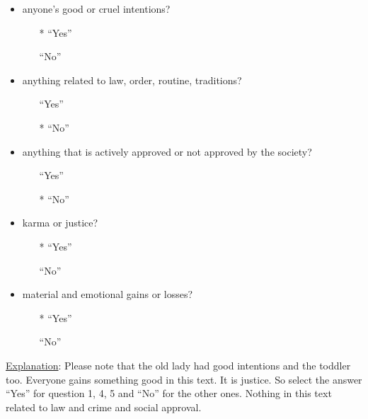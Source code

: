 \documentclass[11pt]{article}
\makeatletter
\newcommand*{\radiobutton}{\@ifstar{\@radiobutton0}{\@radiobutton1}}
\newcommand*{\@radiobutton}[1]{\begin{tikzpicture}
    \pgfmathsetlengthmacro\radius{height("X")/3}
    \draw[radius=\radius] circle;
    \ifcase#1 \fill[radius=.6*\radius] circle;\fi
  \end{tikzpicture}}
\makeatother
\begin{document}
\begin{table*}[t!]
\begin{minipage}[t]{.43\linewidth}
    \begin{itemize}[noitemsep,topsep=0.1pt]
            \item anyone's good or cruel intentions?
            \begin{itemize}[topsep=0.1pt,noitemsep]
                \item[\radiobutton*] ``Yes''
                \item[\radiobutton] ``No''
            \end{itemize}
            \item anything related to law, order, routine, traditions?
            \begin{itemize}[topsep=0.1pt,noitemsep]
                \item[\radiobutton] ``Yes''
                \item[\radiobutton*] ``No''
            \end{itemize}
            \item anything that is actively approved or not approved by the society?
            \begin{itemize}[topsep=0.1pt,noitemsep]
                \item[\radiobutton] ``Yes''
                \item[\radiobutton*] ``No''
            \end{itemize}
            \item karma or justice?
            \begin{itemize}[topsep=0.1pt,noitemsep]
                \item[\radiobutton*] ``Yes''
                \item[\radiobutton] ``No''
            \end{itemize}
            \item material and emotional gains or losses?
            \begin{itemize}[topsep=0.1pt,noitemsep]
                \item[\radiobutton*] ``Yes''
                \item[\radiobutton] ``No''
            \end{itemize}
        \end{itemize}


    \noindent \underline{Explanation}: Please note that the old lady had good intentions and the toddler too. Everyone gains something good in this text. It is justice. So select the answer ``Yes'' for question 1, 4, 5 and ``No'' for the other ones. Nothing in this text related to law and crime and social approval.




\end{minipage}
\end{table*}
\end{document}
